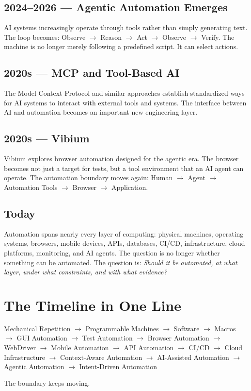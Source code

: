 \documentclass[11pt,twoside]{book}
\begin{document}
\subsection*{2024–2026 — Agentic Automation Emerges}
AI systems increasingly operate through tools rather than simply generating text.
The loop becomes: Observe $\rightarrow$ Reason $\rightarrow$ Act $\rightarrow$ Observe $\rightarrow$ Verify.
The machine is no longer merely following a predefined script. It can select actions.

\subsection*{2020s — MCP and Tool-Based AI}
The Model Context Protocol and similar approaches establish standardized ways for AI systems to interact with external tools and systems.
The interface between AI and automation becomes an important new engineering layer.

\subsection*{2020s — Vibium}
Vibium explores browser automation designed for the agentic era.
The browser becomes not just a target for tests, but a tool environment that an AI agent can operate.
The automation boundary moves again: Human $\rightarrow$ Agent $\rightarrow$ Automation Tools $\rightarrow$ Browser $\rightarrow$ Application.

\subsection*{Today}
Automation spans nearly every layer of computing: physical machines, operating systems, browsers, mobile devices, APIs, databases, CI/CD, infrastructure, cloud platforms, monitoring, and AI agents.
The question is no longer whether something can be automated.
The question is: \emph{Should it be automated, at what layer, under what constraints, and with what evidence?}

\section*{The Timeline in One Line}
\begin{center}
Mechanical Repetition $\rightarrow$ Programmable Machines $\rightarrow$ Software $\rightarrow$ Macros $\rightarrow$ GUI Automation $\rightarrow$ Test Automation $\rightarrow$ Browser Automation $\rightarrow$ WebDriver $\rightarrow$ Mobile Automation $\rightarrow$ API Automation $\rightarrow$ CI/CD $\rightarrow$ Cloud Infrastructure $\rightarrow$ Context-Aware Automation $\rightarrow$ AI-Assisted Automation $\rightarrow$ Agentic Automation $\rightarrow$ Intent-Driven Automation
\end{center}
The boundary keeps moving.
\end{document}
